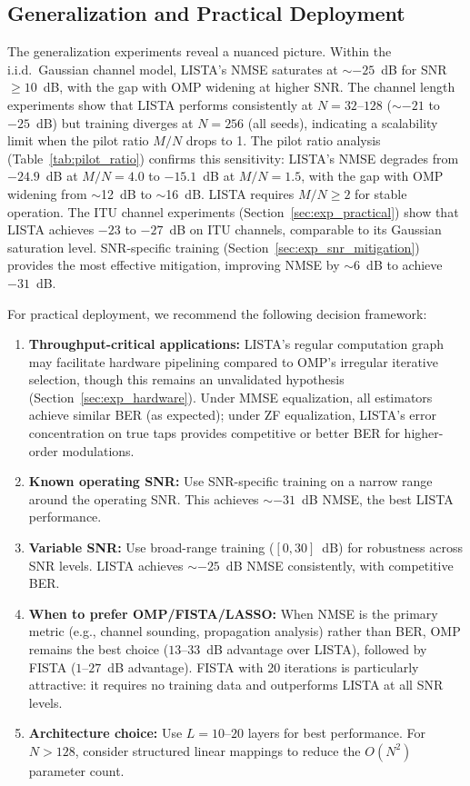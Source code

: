 \documentclass[a4paper,fleqn]{cas-sc}
\begin{document}
\subsection{Generalization and Practical Deployment}

The generalization experiments reveal a nuanced picture. Within the i.i.d.~Gaussian channel model, LISTA's NMSE saturates at $\sim$$-25$~dB for SNR $\geq 10$~dB, with the gap with OMP widening at higher SNR. The channel length experiments show that LISTA performs consistently at $N=32$--$128$ ($\sim$$-21$ to $-25$~dB) but training diverges at $N=256$ (all seeds), indicating a scalability limit when the pilot ratio $M/N$ drops to 1. The pilot ratio analysis (Table~\ref{tab:pilot_ratio}) confirms this sensitivity: LISTA's NMSE degrades from $-24.9$~dB at $M/N=4.0$ to $-15.1$~dB at $M/N=1.5$, with the gap with OMP widening from $\sim$12~dB to $\sim$16~dB. LISTA requires $M/N \geq 2$ for stable operation. The ITU channel experiments (Section~\ref{sec:exp_practical}) show that LISTA achieves $-23$ to $-27$~dB on ITU channels, comparable to its Gaussian saturation level. SNR-specific training (Section~\ref{sec:exp_snr_mitigation}) provides the most effective mitigation, improving NMSE by $\sim$6~dB to achieve $-31$~dB.

For practical deployment, we recommend the following decision framework:

\begin{enumerate}
\item \textbf{Throughput-critical applications:} LISTA's regular computation graph may facilitate hardware pipelining compared to OMP's irregular iterative selection, though this remains an unvalidated hypothesis (Section~\ref{sec:exp_hardware}). Under MMSE equalization, all estimators achieve similar BER (as expected); under ZF equalization, LISTA's error concentration on true taps provides competitive or better BER for higher-order modulations.

\item \textbf{Known operating SNR:} Use SNR-specific training on a narrow range around the operating SNR. This achieves $\sim$$-31$~dB NMSE, the best LISTA performance.

\item \textbf{Variable SNR:} Use broad-range training ($[0, 30]$~dB) for robustness across SNR levels. LISTA achieves $\sim$$-25$~dB NMSE consistently, with competitive BER.

\item \textbf{When to prefer OMP/FISTA/LASSO:} When NMSE is the primary metric (e.g., channel sounding, propagation analysis) rather than BER, OMP remains the best choice ($13$--$33$~dB advantage over LISTA), followed by FISTA ($1$--$27$~dB advantage). FISTA with 20 iterations is particularly attractive: it requires no training data and outperforms LISTA at all SNR levels.

\item \textbf{Architecture choice:} Use $L=10$--$20$ layers for best performance. For $N > 128$, consider structured linear mappings to reduce the $O(N^2)$ parameter count.
\end{enumerate}
\end{document}
